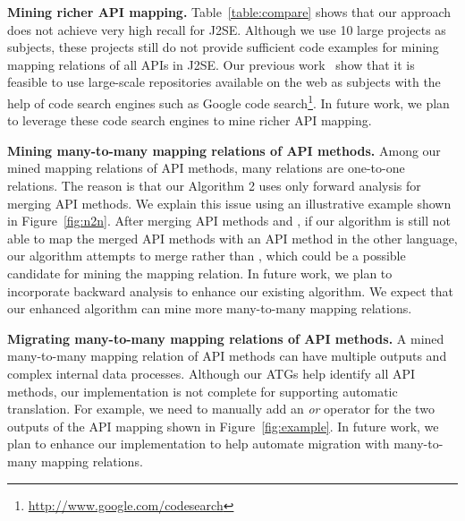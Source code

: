 \textbf{Mining richer API mapping.} Table~\ref{table:compare} shows
that our approach does not achieve very high recall for J2SE. Although we
use 10 large projects as subjects, these projects still do not
provide sufficient code examples for mining mapping relations of all
APIs in J2SE. Our previous
work~\cite{thummalapenta07parseweb,thummalapentaase08spotweb} show
that it is feasible to use large-scale repositories available on the
web as subjects with the help of code search engines such as Google
code search\footnote{\url{http://www.google.com/codesearch}}. In
future work, we plan to leverage these code search engines to mine
richer API mapping.


\textbf{Mining many-to-many mapping relations of API methods.} Among
our mined mapping relations of API methods, many relations are
one-to-one relations. The reason is that our Algorithm 2 uses only
forward analysis for merging API methods. We explain this issue
using an illustrative example shown in Figure~\ref{fig:n2n}. After
merging API methods  and , if our
algorithm is still not able to map the merged API methods with an API
method in the other language, our algorithm attempts to merge
 rather than , which could be a
possible candidate for mining the mapping relation. In future work,
we plan to incorporate backward analysis to enhance our existing
algorithm. We expect that our enhanced algorithm can mine more
many-to-many mapping relations.

\textbf{Migrating many-to-many mapping relations of API methods.}
A mined many-to-many mapping relation of API methods can have multiple outputs
and complex internal data processes. Although our ATGs
help identify all API methods, our implementation is not complete
for supporting automatic translation. For example, we need to manually add an
\emph{or} operator for the two outputs of the API mapping shown in
Figure~\ref{fig:example}. In future work, we plan to enhance our implementation to help
automate migration with many-to-many mapping relations.

